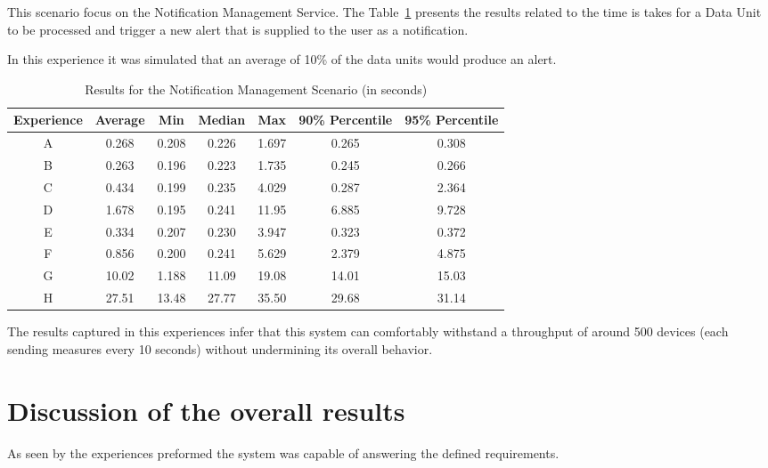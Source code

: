 This scenario focus on the Notification Management Service. The Table~\ref{tab:evaluation:experiences:notification:results} presents the results related to the time is takes for a Data Unit to be processed and trigger a new alert that is  supplied to the user as a notification.

In this experience it was simulated that an average of 10\% of the data units would produce an alert.

\begin{table}[H]
    \centering
    \begin{tabular}{@{}ccccccc@{}}
    \toprule
    \textbf{Experience} & \textbf{Average} & \textbf{Min} & \textbf{Median} & \textbf{Max} & \textbf{90\% Percentile} & \textbf{95\% Percentile} \\ \midrule
    A & 0.268 & 0.208 & 0.226 & 1.697 & 0.265 & 0.308 \\ \midrule
    B & 0.263 & 0.196 & 0.223 & 1.735 & 0.245 & 0.266 \\ \midrule
    C & 0.434 & 0.199 & 0.235 & 4.029 & 0.287 & 2.364 \\ \midrule
    D & 1.678 & 0.195 & 0.241 & 11.95 & 6.885 & 9.728 \\ \midrule
    E & 0.334 & 0.207 & 0.230 & 3.947 & 0.323 & 0.372 \\ \midrule
    F & 0.856 & 0.200 & 0.241 & 5.629 & 2.379 & 4.875 \\ \midrule
    G & 10.02 & 1.188 & 11.09 & 19.08 & 14.01 & 15.03 \\ \midrule
    H & 27.51 & 13.48 & 27.77 & 35.50 & 29.68 & 31.14 \\ \bottomrule
    \end{tabular}
    \caption{Results for the Notification Management Scenario (in seconds)}
    \label{tab:evaluation:experiences:notification:results}
\end{table}

The results captured in this experiences infer that this system can comfortably withstand a throughput of around 500 devices (each sending measures every 10 seconds) without undermining its overall behavior.

\section{Discussion of the overall results}
\label{subsubsec:evaluation:overview}

As seen by the experiences preformed the system was capable of answering the defined requirements.


